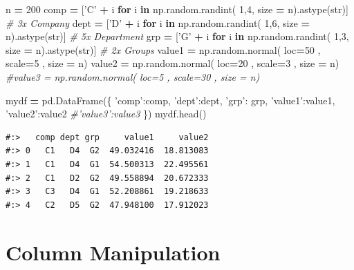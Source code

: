 \documentclass[
]{book}
\newenvironment{Shaded}{\begin{snugshade}}{\end{snugshade}}
\newcommand{\BuiltInTok}[1]{#1}
\newcommand{\CommentTok}[1]{\textcolor[rgb]{0.37,0.37,0.37}{\textit{#1}}}
\newcommand{\ControlFlowTok}[1]{\textcolor[rgb]{0.27,0.27,0.27}{\textbf{#1}}}
\newcommand{\DecValTok}[1]{\textcolor[rgb]{0.06,0.06,0.06}{#1}}
\newcommand{\KeywordTok}[1]{\textcolor[rgb]{0.27,0.27,0.27}{\textbf{#1}}}
\newcommand{\NormalTok}[1]{#1}
\newcommand{\OperatorTok}[1]{\textcolor[rgb]{0.43,0.43,0.43}{\textbf{#1}}}
\newcommand{\StringTok}[1]{\textcolor[rgb]{0.5,0.5,0.5}{#1}}
\begin{document}
\begin{Shaded}
\begin{Highlighting}[]
\NormalTok{n }\OperatorTok{=} \DecValTok{200}
\NormalTok{comp }\OperatorTok{=}\NormalTok{ [}\StringTok{'C'} \OperatorTok{+}\NormalTok{ i }\ControlFlowTok{for}\NormalTok{ i }\KeywordTok{in}\NormalTok{ np.random.randint( }\DecValTok{1}\NormalTok{,}\DecValTok{4}\NormalTok{, size  }\OperatorTok{=}\NormalTok{ n).astype(}\BuiltInTok{str}\NormalTok{)] }\CommentTok{# 3x Company}
\NormalTok{dept }\OperatorTok{=}\NormalTok{ [}\StringTok{'D'} \OperatorTok{+}\NormalTok{ i }\ControlFlowTok{for}\NormalTok{ i }\KeywordTok{in}\NormalTok{ np.random.randint( }\DecValTok{1}\NormalTok{,}\DecValTok{6}\NormalTok{, size  }\OperatorTok{=}\NormalTok{ n).astype(}\BuiltInTok{str}\NormalTok{)] }\CommentTok{# 5x Department}
\NormalTok{grp }\OperatorTok{=}\NormalTok{  [}\StringTok{'G'} \OperatorTok{+}\NormalTok{ i }\ControlFlowTok{for}\NormalTok{ i }\KeywordTok{in}\NormalTok{ np.random.randint( }\DecValTok{1}\NormalTok{,}\DecValTok{3}\NormalTok{, size  }\OperatorTok{=}\NormalTok{ n).astype(}\BuiltInTok{str}\NormalTok{)] }\CommentTok{# 2x Groups}
\NormalTok{value1 }\OperatorTok{=}\NormalTok{ np.random.normal( loc}\OperatorTok{=}\DecValTok{50}\NormalTok{ , scale}\OperatorTok{=}\DecValTok{5}\NormalTok{ , size }\OperatorTok{=}\NormalTok{ n)}
\NormalTok{value2 }\OperatorTok{=}\NormalTok{ np.random.normal( loc}\OperatorTok{=}\DecValTok{20}\NormalTok{ , scale}\OperatorTok{=}\DecValTok{3}\NormalTok{ , size }\OperatorTok{=}\NormalTok{ n)}
\CommentTok{#value3 = np.random.normal( loc=5 , scale=30 , size = n)}

\NormalTok{mydf }\OperatorTok{=}\NormalTok{ pd.DataFrame(\{}
    \StringTok{'comp'}\NormalTok{:comp, }
    \StringTok{'dept'}\NormalTok{:dept, }
    \StringTok{'grp'}\NormalTok{: grp,}
    \StringTok{'value1'}\NormalTok{:value1, }
    \StringTok{'value2'}\NormalTok{:value2}
    \CommentTok{#'value3':value3 }
\NormalTok{\})}
\NormalTok{mydf.head()}
\end{Highlighting}
\end{Shaded}

\begin{verbatim}
#:>   comp dept grp     value1     value2
#:> 0   C1   D4  G2  49.032416  18.813083
#:> 1   C1   D4  G1  54.500313  22.495561
#:> 2   C1   D2  G2  49.558894  20.672333
#:> 3   C3   D4  G1  52.208861  19.218633
#:> 4   C2   D5  G2  47.948100  17.912023
\end{verbatim}

\hypertarget{column-manipulation}{%
\section{Column Manipulation}\label{column-manipulation}}
\end{document}
